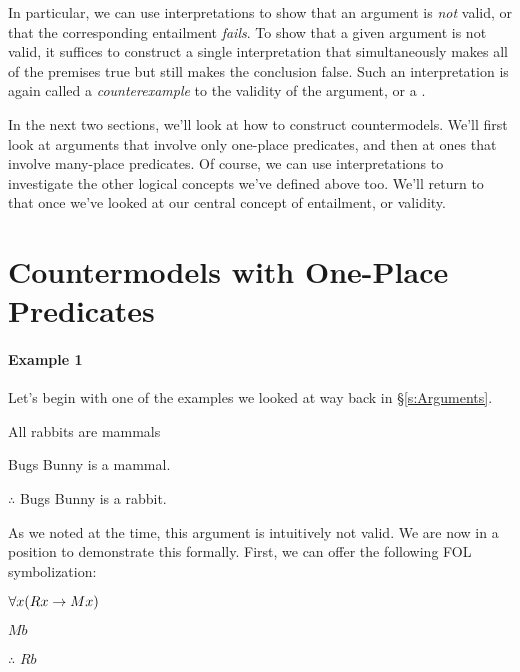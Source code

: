 In particular, we can use interpretations to show that an argument is \emph{not} valid, or that the corresponding entailment \emph{fails}.  To show that a given argument is not valid, it suffices to construct a single interpretation that simultaneously makes all of the premises true but still makes the conclusion false.  Such an interpretation is again called a \emph{counterexample} to the validity of the argument, or a .


In the next two sections, we'll look at how to construct countermodels.  We'll first look at arguments that involve only one-place predicates, and then at ones that involve many-place predicates.  Of course, we can use interpretations to investigate the other logical concepts we've defined above too.  We'll return to that once we've looked at our central concept of entailment, or validity.

\section{Countermodels with One-Place Predicates}\label{s:CountermodelOnePl}

\paragraph{Example 1} Let's begin with one of the examples we looked at way back in \S\ref{s:Arguments}.

\begin{earg}
\item[\ex{exarg4}]All rabbits are mammals
\item[] Bugs Bunny is a mammal.
\item[] $\therefore$ Bugs Bunny is a rabbit.
\end{earg}

\noindent As we noted at the time, this argument is intuitively not valid.  We are now in a position to demonstrate this formally.  First, we can offer the following FOL symbolization:

\begin{earg}
\item[] $\forall x(Rx \rightarrow Mx)$
\item[] $Mb$
\item[] $\therefore$ $Rb$
\end{earg}

